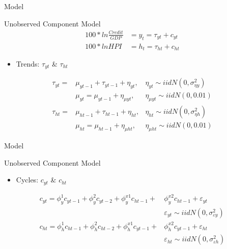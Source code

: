 \documentclass[
  ignorenonframetext,
]{beamer}
\providecommand{\tightlist}{%
  \setlength{\itemsep}{0pt}\setlength{\parskip}{0pt}}
\begin{document}
\begin{frame}{Model}
\protect\hypertarget{model}{}
\begin{block}{Unobserved Component Model}
\protect\hypertarget{unobserved-component-model}{}
\begin{align}
    100*ln \frac{Credit}{GDP} &= y_t = \tau_{yt} + c_{yt}
    \\
    100*ln HPI &= h_t = \tau_{ht} + c_{ht}
\end{align}

\begin{itemize}
\tightlist
\item
  Trends: \(\tau_{yt}\) \& \(\tau_{ht}\)
\end{itemize}

\begin{align*}
        \tau_{yt} = &\mu_{yt-1} + \tau_{yt-1} +  \eta_{yt}, &\eta_{yt} \sim iidN(0,\sigma^2_{\eta y})
\\
&\mu_{yt} = \mu_{yt-1} + \eta_{\mu yt}, &\eta_{\mu yt} \sim iidN(0,0.01)
\\
\tau_{ht} = &\mu_{ht-1} + \tau_{ht-1} + \eta_{ht}, &\eta_{ht} \sim iidN(0,\sigma^2_{\eta h})
\\
&\mu_{ht} = \mu_{ht-1} + \eta_{\mu ht}, &\eta_{\mu ht} \sim iidN(0,0.01)  
\end{align*}
\end{block}
\end{frame}

\begin{frame}{Model}
\protect\hypertarget{model-1}{}
\begin{block}{Unobserved Component Model}
\protect\hypertarget{unobserved-component-model-1}{}
\begin{itemize}
\tightlist
\item
  Cycles: \(c_{yt}\) \& \(c_{ht}\)
\end{itemize}

\begin{align}
    c_{yt} = \phi^1_{y}c_{yt-1}  
    + \phi^2_{y}c_{yt-2}  
    + \phi^{x1}_{y}c_{ht-1} 
    + &\phi^{x2}_{y}c_{ht-1} 
    + \varepsilon_{yt}\\
    &\varepsilon_{yt} \sim iidN(0,\sigma^2_{\varepsilon y})        
    \\
    c_{ht} = \phi^1_{h}c_{ht-1}  
    + \phi^2_{h}c_{ht-2}
    + \phi^{x1}_{h}c_{yt-1}  
    + &\phi^{x2}_{h}c_{yt-1}  
    + \varepsilon_{ht}\\
    &\varepsilon_{ht} \sim iidN(0,\sigma^2_{\varepsilon h})
\end{align}
\end{block}
\end{frame}
\end{document}
